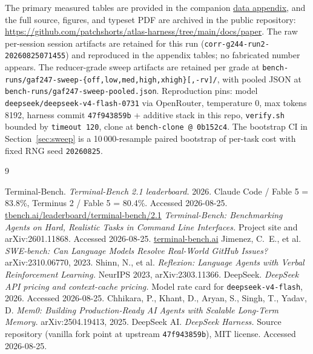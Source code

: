 \documentclass[11pt]{article}
\begin{document}
The primary measured tables are provided in the companion \href{data-appendix.md}{data appendix}, and the full source, figures, and typeset PDF are archived in the public repository: \url{https://github.com/patchshorts/atlas-harness/tree/main/docs/paper}. The raw per-session session artifacts are retained for this run (\texttt{corr-g244-run2-20260825071455}) and reproduced in the appendix tables; no fabricated number appears. The reducer-grade sweep artifacts are retained per grade at \texttt{bench-runs/gaf247-sweep-\{off,low,med,high,xhigh\}[,-rv]/}, with pooled JSON at \texttt{bench-runs/gaf247-sweep-pooled.json}. Reproduction pins: model \texttt{deepseek/deepseek-v4-flash-0731} via OpenRouter, temperature 0, max tokens 8192, harness commit \texttt{47f943859b} + additive stack in this repo, \texttt{verify.sh} bounded by \texttt{timeout 120}, clone at \texttt{bench-clone @ 0b152c4}. The bootstrap CI in Section~\ref{sec:sweep} is a 10\,000-resample paired bootstrap of per-task cost with fixed RNG seed \texttt{20260825}.

\begin{thebibliography}{9}

 Terminal-Bench. \emph{Terminal-Bench 2.1 leaderboard.} 2026. Claude Code / Fable 5 = 83.8\%, Terminus 2 / Fable 5 = 80.4\%. Accessed 2026-08-25. \url{tbench.ai/leaderboard/terminal-bench/2.1}
 \emph{Terminal-Bench: Benchmarking Agents on Hard, Realistic Tasks in Command Line Interfaces.} Project site and arXiv:2601.11868. Accessed 2026-08-25. \url{terminal-bench.ai}
 Jimenez, C.~E., et al. \emph{SWE-bench: Can Language Models Resolve Real-World GitHub Issues?} arXiv:2310.06770, 2023.
 Shinn, N., et al. \emph{Reflexion: Language Agents with Verbal Reinforcement Learning.} NeurIPS 2023, arXiv:2303.11366.
 DeepSeek. \emph{DeepSeek API pricing and context-cache pricing.} Model rate card for \texttt{deepseek-v4-flash}, 2026. Accessed 2026-08-25.
 Chhikara, P., Khant, D., Aryan, S., Singh, T., Yadav, D. \emph{Mem0: Building Production-Ready AI Agents with Scalable Long-Term Memory.} arXiv:2504.19413, 2025.
 DeepSeek AI. \emph{DeepSeek Harness.} Source repository (vanilla fork point at upstream \texttt{47f943859b}), MIT license. Accessed 2026-08-25.

\end{thebibliography}
\end{document}
